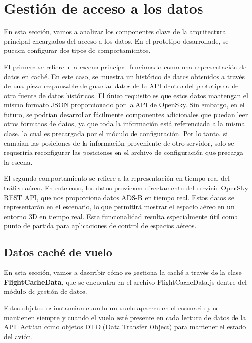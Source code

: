 \documentclass[a4paper, 11pt]{book}
\begin{document}
\section{Gestión de acceso a los datos}
\label{sec:data}
En esta sección, vamos a analizar los componentes clave de la arquitectura principal encargados del acceso a los datos. En el prototipo desarrollado, se pueden configurar dos tipos de comportamientos.

El primero se refiere a la escena principal funcionado como una representación de datos en caché. En este caso, se muestra un histórico de datos obtenidos a través de una pieza responsable de guardar datos de la API dentro del prototipo o de otra fuente de datos históricos. El único requisito es que estos datos mantengan el mismo formato JSON proporcionado por la API de OpenSky. Sin embargo, en el futuro, se podrían desarrollar fácilmente componentes adicionales que puedan leer otros formatos de datos, ya que toda la información está referenciada a la misma clase, la cual es precargada por el módulo de configuración. Por lo tanto, si cambian las posiciones de la información proveniente de otro servidor, solo se requeriría reconfigurar las posiciones en el archivo de configuración que precarga la escena.

El segundo comportamiento se refiere a la representación en tiempo real del tráfico aéreo. En este caso, los datos provienen directamente del servicio OpenSky REST API, que nos proporciona datos ADS-B en tiempo real. Estos datos se representarán en el escenario, lo que permitirá mostrar el espacio aéreo en un entorno 3D en tiempo real. Esta funcionalidad resulta especialmente útil como punto de partida para aplicaciones de control de espacios aéreos.
\subsection{Datos caché de vuelo}
\label{subsec:datosCacheVuelo}
En esta sección, vamos a describir cómo se gestiona la caché a través de la clase \textbf{FlightCacheData}, que se encuentra en el archivo FlightCacheData.js dentro del módulo de gestión de datos.

Estos objetos se instancian cuando un vuelo aparece en el escenario y se mantienen siempre y cuando el vuelo esté presente en cada lectura de datos de la API. Actúan como objetos DTO (Data Transfer Object) para mantener el estado del avión.
\end{document}
